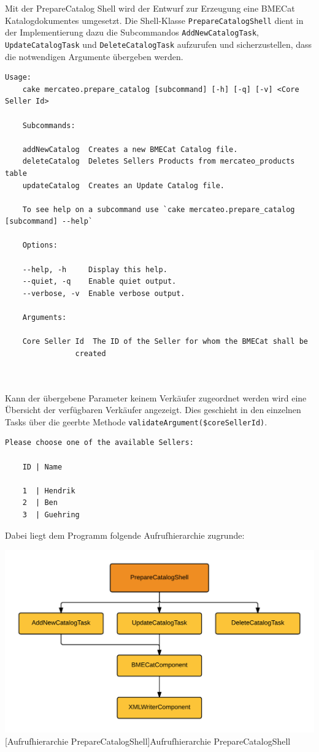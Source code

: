 	Mit der PrepareCatalog Shell wird der Entwurf zur Erzeugung eine BMECat Katalogdokumentes umgesetzt. Die Shell-Klasse \texttt{PrepareCatalogShell} dient in der Implementierung  dazu die Subcommandos \texttt{AddNewCatalogTask}, \texttt{UpdateCatalogTask} und \texttt{DeleteCatalogTask} aufzurufen und sicherzustellen, dass die notwendigen Argumente übergeben werden.
	\lstset{basicstyle=\scriptsize\ttfamily,language=xml}
	\begin{lstlisting}[caption={Konsolenausgabe bei Aufruf der PrepareCatalogShell}]
	Usage:
	cake mercateo.prepare_catalog [subcommand] [-h] [-q] [-v] <Core Seller Id>
	
	Subcommands:
	
	addNewCatalog  Creates a new BMECat Catalog file.
	deleteCatalog  Deletes Sellers Products from mercateo_products table
	updateCatalog  Creates an Update Catalog file.
	
	To see help on a subcommand use `cake mercateo.prepare_catalog [subcommand] --help`
	
	Options:
	
	--help, -h     Display this help.
	--quiet, -q    Enable quiet output.
	--verbose, -v  Enable verbose output.
	
	Arguments:
	
	Core Seller Id  The ID of the Seller for whom the BMECat shall be
	            created

	
	\end{lstlisting}
	
	Kann der übergebene Parameter keinem Verkäufer zugeordnet werden wird eine Übersicht der verfügbaren Verkäufer angezeigt. Dies geschieht in den einzelnen Tasks über die geerbte Methode \texttt{validateArgument(\$coreSellerId)}.
	
	\begin{lstlisting}[caption={Auflistung der verfügbaren Verkäufer}]
	Please choose one of the available Sellers:
	
	ID | Name
	
	1  | Hendrik
	2  | Ben
	3  | Guehring
	\end{lstlisting}
	
	Dabei liegt dem Programm folgende Aufrufhierarchie zugrunde:\\
	\begin{minipage}{\linewidth}
		\vspace{1em}
		\centering
		\includegraphics[width=0.7 \linewidth]{img/Aufrufhierarchie}
		[Aufrufhierarchie PrepareCatalogShell]{Aufrufhierarchie PrepareCatalogShell}
		\vspace{1em}
	\end{minipage}\\
	
